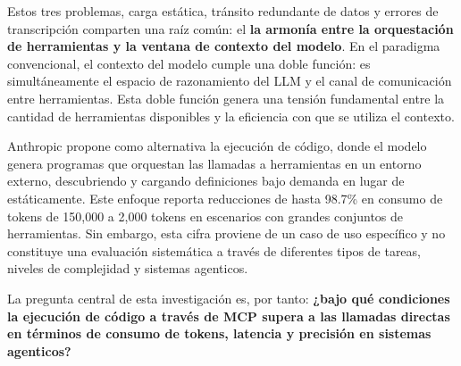Estos tres problemas, carga estática, tránsito redundante de datos y errores
de transcripción comparten una raíz común: el \textbf{la armonía entre la
orquestación de herramientas y la ventana de contexto del modelo}. En el
paradigma convencional, el contexto del modelo cumple una doble función: es
simultáneamente el espacio de razonamiento del LLM y el canal de comunicación
entre herramientas. Esta doble función genera una tensión fundamental entre la
cantidad de herramientas disponibles y la eficiencia con que se utiliza el
contexto.

Anthropic propone como alternativa la ejecución de código,
donde el modelo genera programas que orquestan las llamadas a herramientas en un
entorno externo, descubriendo y cargando definiciones bajo demanda en lugar de
estáticamente. Este enfoque reporta reducciones de hasta 98.7\% en consumo de
tokens de 150,000 a 2,000 tokens en escenarios con grandes conjuntos de
herramientas. Sin embargo, esta cifra proviene de un caso de uso específico y no
constituye una evaluación sistemática a través de diferentes tipos de tareas,
niveles de complejidad y sistemas agenticos.

La pregunta central de esta investigación es, por tanto: \textbf{¿bajo qué
condiciones la ejecución de código a través de MCP supera a las llamadas
directas en términos de consumo de tokens, latencia y precisión en sistemas agenticos?}
